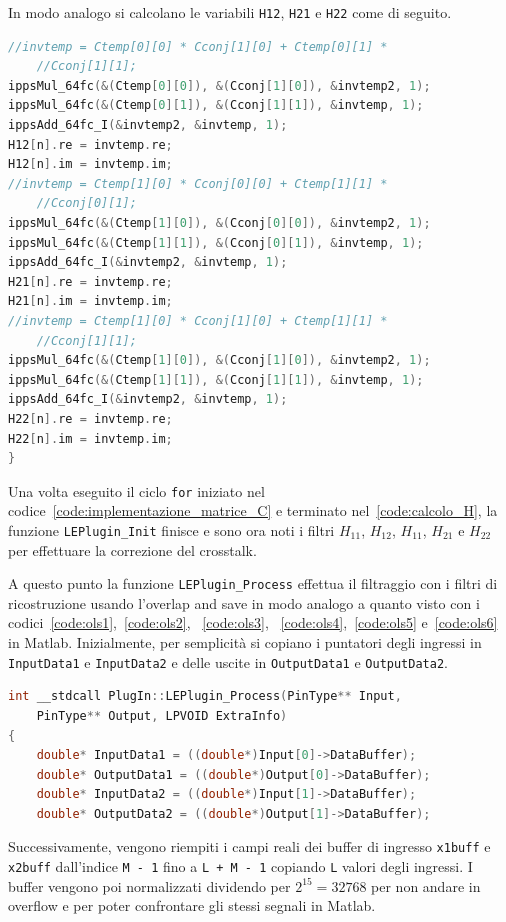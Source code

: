 \documentclass[12pt,a4paper,titlepage]{article}
\begin{document}
In modo analogo si calcolano le variabili \texttt{H12}, \texttt{H21} e \texttt{H22} come di seguito.
\begin{lstlisting}[language=cpp, label=code:calcolo_H, caption = Calcolo dell'$n$-esima armonica di \texttt{H12, H21, H22}, breaklines = false, captionpos = b]
//invtemp = Ctemp[0][0] * Cconj[1][0] + Ctemp[0][1] * 
	//Cconj[1][1];
ippsMul_64fc(&(Ctemp[0][0]), &(Cconj[1][0]), &invtemp2, 1);
ippsMul_64fc(&(Ctemp[0][1]), &(Cconj[1][1]), &invtemp, 1);
ippsAdd_64fc_I(&invtemp2, &invtemp, 1);
H12[n].re = invtemp.re;
H12[n].im = invtemp.im;
//invtemp = Ctemp[1][0] * Cconj[0][0] + Ctemp[1][1] *
	//Cconj[0][1];
ippsMul_64fc(&(Ctemp[1][0]), &(Cconj[0][0]), &invtemp2, 1);
ippsMul_64fc(&(Ctemp[1][1]), &(Cconj[0][1]), &invtemp, 1);
ippsAdd_64fc_I(&invtemp2, &invtemp, 1);
H21[n].re = invtemp.re;
H21[n].im = invtemp.im;
//invtemp = Ctemp[1][0] * Cconj[1][0] + Ctemp[1][1] * 
	//Cconj[1][1];
ippsMul_64fc(&(Ctemp[1][0]), &(Cconj[1][0]), &invtemp2, 1);
ippsMul_64fc(&(Ctemp[1][1]), &(Cconj[1][1]), &invtemp, 1);
ippsAdd_64fc_I(&invtemp2, &invtemp, 1);
H22[n].re = invtemp.re;
H22[n].im = invtemp.im;
}
\end{lstlisting}
Una volta eseguito il ciclo \texttt{for} iniziato nel codice~\ref{code:implementazione_matrice_C} e terminato nel~\ref{code:calcolo_H}, la funzione \texttt{LEPlugin\_Init} finisce e sono ora noti i filtri $H_{11}$, $H_{12}$, $H_{11}$, $H_{21}$ e $H_{22}$ per effettuare la correzione del crosstalk.

A questo punto la funzione \texttt{LEPlugin\_Process} effettua il filtraggio con i filtri di ricostruzione usando l'overlap and save in modo analogo a quanto visto con i codici~\ref{code:ols1},~\ref{code:ols2}, ~\ref{code:ols3}, ~\ref{code:ols4},~\ref{code:ols5} e~\ref{code:ols6} in Matlab. Inizialmente, per semplicità si copiano i puntatori degli ingressi in \texttt{InputData1} e \texttt{InputData2} e delle uscite in \texttt{OutputData1} e \texttt{OutputData2}.

\begin{lstlisting}[language=cpp, label=code:copia_puntatori, caption = Copia dei puntatori degli ingressi e delle uscite, breaklines = false, captionpos = b]
int __stdcall PlugIn::LEPlugin_Process(PinType** Input, 
	PinType** Output, LPVOID ExtraInfo)
{
	double* InputData1 = ((double*)Input[0]->DataBuffer);
	double* OutputData1 = ((double*)Output[0]->DataBuffer);
	double* InputData2 = ((double*)Input[1]->DataBuffer);
	double* OutputData2 = ((double*)Output[1]->DataBuffer);
\end{lstlisting}
Successivamente, vengono riempiti i campi reali dei buffer di ingresso \texttt{x1buff} e \texttt{x2buff} dall'indice \texttt{M - 1} fino a \texttt{L + M - 1} copiando \texttt{L} valori degli ingressi. I buffer vengono poi normalizzati dividendo per $2^{15} = 32768$ per non andare in overflow e per poter confrontare gli stessi segnali in Matlab.
\end{document}
